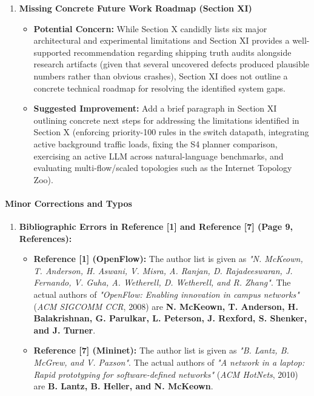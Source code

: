 \documentclass[11pt,a4paper]{article}
\begin{document}
\begin{enumerate}[leftmargin=1.6em,itemsep=3pt]
\item \textbf{Missing Concrete Future Work Roadmap (Section XI)}
\begin{itemize}[leftmargin=1.8em,itemsep=2pt]
\item \textbf{Potential Concern:} While Section X candidly lists six major architectural and experimental limitations and Section XI provides a well-supported recommendation regarding shipping truth audits alongside research artifacts (given that several uncovered defects produced plausible numbers rather than obvious crashes), Section XI does not outline a concrete technical roadmap for resolving the identified system gaps.
\item \textbf{Suggested Improvement:} Add a brief paragraph in Section XI outlining concrete next steps for addressing the limitations identified in Section X (enforcing priority-100 rules in the switch datapath, integrating active background traffic loads, fixing the S4 planner comparison, exercising an active LLM across natural-language benchmarks, and evaluating multi-flow/scaled topologies such as the Internet Topology Zoo).
\end{itemize}
\end{enumerate}
\paragraph{Minor Corrections and Typos}
\begin{enumerate}[leftmargin=1.6em,itemsep=3pt]
\item \textbf{Bibliographic Errors in Reference [1] and Reference [7] (Page 9, References):}
\begin{itemize}[leftmargin=1.8em,itemsep=2pt]
\item \textbf{Reference [1] (OpenFlow):} The author list is given as \emph{"N. McKeown, T. Anderson, H. Aswani, V. Misra, A. Ranjan, D. Rajadeeswaran, J. Fernando, V. Guha, A. Wetherell, D. Wetherell, and R. Zhang"}. The actual authors of \emph{"OpenFlow: Enabling innovation in campus networks"} (\emph{ACM SIGCOMM CCR}, 2008) are \textbf{N. McKeown, T. Anderson, H. Balakrishnan, G. Parulkar, L. Peterson, J. Rexford, S. Shenker, and J. Turner}.
\item \textbf{Reference [7] (Mininet):} The author list is given as \emph{"B. Lantz, B. McGrew, and V. Paxson"}. The actual authors of \emph{"A network in a laptop: Rapid prototyping for software-defined networks"} (\emph{ACM HotNets}, 2010) are \textbf{B. Lantz, B. Heller, and N. McKeown}.
\end{itemize}
\end{enumerate}
\end{document}

